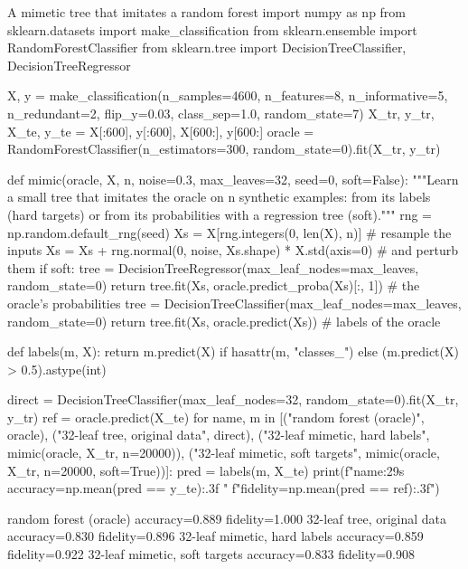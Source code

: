 \begin{pylisting}[label={lst:mimetic}]{A mimetic tree that imitates a random forest}
import numpy as np
from sklearn.datasets import make_classification
from sklearn.ensemble import RandomForestClassifier
from sklearn.tree import DecisionTreeClassifier, DecisionTreeRegressor

X, y = make_classification(n_samples=4600, n_features=8, n_informative=5, n_redundant=2,
                           flip_y=0.03, class_sep=1.0, random_state=7)
X_tr, y_tr, X_te, y_te = X[:600], y[:600], X[600:], y[600:]
oracle = RandomForestClassifier(n_estimators=300, random_state=0).fit(X_tr, y_tr)

def mimic(oracle, X, n, noise=0.3, max_leaves=32, seed=0, soft=False):
    """Learn a small tree that imitates the oracle on n synthetic examples: from its
    labels (hard targets) or from its probabilities with a regression tree (soft)."""
    rng = np.random.default_rng(seed)
    Xs = X[rng.integers(0, len(X), n)]                          # resample the inputs
    Xs = Xs + rng.normal(0, noise, Xs.shape) * X.std(axis=0)    # and perturb them
    if soft:
        tree = DecisionTreeRegressor(max_leaf_nodes=max_leaves, random_state=0)
        return tree.fit(Xs, oracle.predict_proba(Xs)[:, 1])  # the oracle's probabilities
    tree = DecisionTreeClassifier(max_leaf_nodes=max_leaves, random_state=0)
    return tree.fit(Xs, oracle.predict(Xs))                     # labels of the oracle

def labels(m, X):
    return m.predict(X) if hasattr(m, "classes_") else (m.predict(X) > 0.5).astype(int)

direct = DecisionTreeClassifier(max_leaf_nodes=32, random_state=0).fit(X_tr, y_tr)
ref = oracle.predict(X_te)
for name, m in [("random forest (oracle)", oracle), ("32-leaf tree, original data", direct),
                ("32-leaf mimetic, hard labels", mimic(oracle, X_tr, n=20000)),
                ("32-leaf mimetic, soft targets", mimic(oracle, X_tr, n=20000, soft=True))]:
    pred = labels(m, X_te)
    print(f"{name:29s} accuracy={np.mean(pred == y_te):.3f}  "
          f"fidelity={np.mean(pred == ref):.3f}")
\end{pylisting}
\begin{pyoutput}
random forest (oracle)        accuracy=0.889  fidelity=1.000
32-leaf tree, original data   accuracy=0.830  fidelity=0.896
32-leaf mimetic, hard labels  accuracy=0.859  fidelity=0.922
32-leaf mimetic, soft targets accuracy=0.833  fidelity=0.908
\end{pyoutput}

